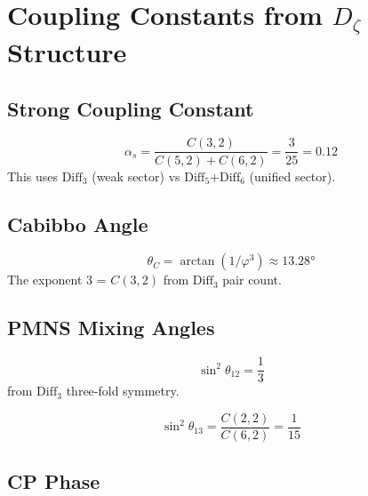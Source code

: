 \chapter{Coupling Constants from \texorpdfstring{$D_\zeta$}{Dζ} Structure}
\label{chap:pd_coupling}

\section{Strong Coupling Constant}
\label{sec:coupling_strong}

\begin{theorem}
\label{thm:coupling_strong}
\leanok
\[
\alpha_s = \frac{C(3,2)}{C(5,2) + C(6,2)} = \frac{3}{25} = 0.12
\]
This uses $\mathrm{Diff}_3$ (weak sector) vs $\mathrm{Diff}_5$+$\mathrm{Diff}_6$ (unified sector).
\end{theorem}

\section{Cabibbo Angle}
\label{sec:coupling_cabibbo}

\begin{theorem}
\label{thm:coupling_cabibbo}
\leanok
\[
\theta_C = \arctan(1/\varphi^3) \approx 13.28°
\]
The exponent 3 = $C(3,2)$ from $\mathrm{Diff}_3$ pair count.
\end{theorem}

\section{PMNS Mixing Angles}
\label{sec:coupling_pmns}

\begin{theorem}
\label{thm:coupling_pmns_solar}
\leanok
\[
\sin^2\theta_{12} = \frac{1}{3}
\]
from $\mathrm{Diff}_3$ three-fold symmetry.
\end{theorem}

\begin{theorem}
\label{thm:coupling_pmns_reactor}
\leanok
\[
\sin^2\theta_{13} = \frac{C(2,2)}{C(6,2)} = \frac{1}{15}
\]
\end{theorem}

\section{CP Phase}
\label{sec:coupling_cp_phase}

